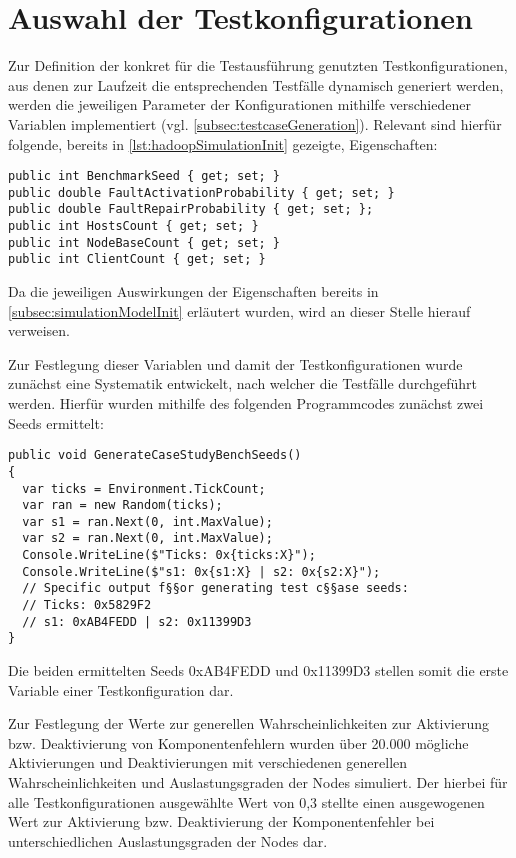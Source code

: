 \section{Auswahl der Testkonfigurationen}
\label{sec:selectTestcases}

Zur Definition der konkret für die Testausführung genutzten Testkonfigurationen, aus denen zur Laufzeit die entsprechenden Testfälle dynamisch generiert werden, werden die jeweiligen Parameter der Konfigurationen mithilfe verschiedener Variablen implementiert (vgl. \cref{subsec:testcaseGeneration}).
Relevant sind hierfür folgende, bereits in \cref{lst:hadoopSimulationInit} gezeigte, Eigenschaften:

\begin{lstlisting}[label=lst:hadoopTest,style=cs,
caption={Zur Definition einer Testkonfiguration relevante Felder}]
public int BenchmarkSeed { get; set; }
public double FaultActivationProbability { get; set; }
public double FaultRepairProbability { get; set; };
public int HostsCount { get; set; }
public int NodeBaseCount { get; set; }
public int ClientCount { get; set; }
\end{lstlisting}

Da die jeweiligen Auswirkungen der Eigenschaften bereits in \cref{subsec:simulationModelInit} erläutert wurden, wird an dieser Stelle hierauf verweisen.

Zur Festlegung dieser Variablen und damit der Testkonfigurationen wurde zunächst eine Systematik entwickelt, nach welcher die Testfälle durchgeführt werden.
Hierfür wurden mithilfe des folgenden Programmcodes zunächst zwei Seeds ermittelt:

\begin{lstlisting}[label=lst:generateTestCaseSeeds,style=cs,
caption={Ermittlung der für die Testkonfigurationen genutzten Basisseeds}]
public void GenerateCaseStudyBenchSeeds()
{
  var ticks = Environment.TickCount;
  var ran = new Random(ticks);
  var s1 = ran.Next(0, int.MaxValue);
  var s2 = ran.Next(0, int.MaxValue);
  Console.WriteLine($"Ticks: 0x{ticks:X}");
  Console.WriteLine($"s1: 0x{s1:X} | s2: 0x{s2:X}");
  // Specific output f§§or generating test c§§ase seeds:
  // Ticks: 0x5829F2
  // s1: 0xAB4FEDD | s2: 0x11399D3
}
\end{lstlisting}

Die beiden ermittelten Seeds 0xAB4FEDD und 0x11399D3 stellen somit die erste Variable einer Testkonfiguration dar.

Zur Festlegung der Werte zur generellen Wahrscheinlichkeiten zur Aktivierung bzw. Deaktivierung von Komponentenfehlern wurden über 20.000 mögliche Aktivierungen und Deaktivierungen mit verschiedenen generellen Wahrscheinlichkeiten und Auslastungsgraden der Nodes simuliert.
Der hierbei für alle Testkonfigurationen ausgewählte Wert von 0,3 stellte einen ausgewogenen Wert zur Aktivierung bzw. Deaktivierung der Komponentenfehler bei unterschiedlichen Auslastungsgraden der Nodes dar.

